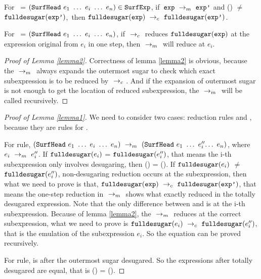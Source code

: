 \begin{lemma}[Emulation]
\label{lemma1}
For~ = $(\mbox{\tt SurfHead}~e_1~\ldots~e_i~\ldots~e_n)\in\mbox{\tt SurfExp}$, if~$\mbox{\tt exp} ~\rightarrow_m~\mbox{\tt exp'}$ and () $\not=$ $\mbox{\tt fulldesugar}(\mbox{\tt exp'})$,~then $\mbox{\tt fulldesugar}(\mbox{\tt exp}) ~\rightarrow_c~\mbox{\tt fulldesugar}(\mbox{\tt exp'})$.

\end{lemma}

\begin{lemma}
\label{lemma2}

For~ = $(\mbox{\tt SurfHead}~e_1~\ldots~e_i~\ldots~e_n)$, if $~\rightarrow_c~$ reduces $\mbox{\tt fulldesugar}(\mbox{\tt exp})$ at the expression original from $e_i$ in one step, then $~\rightarrow_m~$ will reduce  at $e_i$.

\end{lemma}

\begin{proof}[Proof of Lemma \ref{lemma2}]

Correctness of lemma \ref{lemma2} is obvious, because the $~\rightarrow_m~$ always expands the outermost sugar to check which exact subexpression is to be reduced by $~\rightarrow_c~$. And if the expansion of outermost sugar is not enough to get the location of reduced subexpression, the $~\rightarrow_m~$ will be called recursively.
\end{proof}
\begin{proof}[Proof of Lemma \ref{lemma1}]
We need to consider two cases: reduction rules  and , because they are rules for .

For  rule, $\redm{(\m{SurfHead}~e_1~\ldots~e_i~\ldots~e_n)}{(\m{SurfHead}~e_1~\ldots~e_i''$$\ldots~e_n)}$, where $e_i ~\rightarrow_m~e_i''$. 
If $\mbox{\tt fulldesugar}(e_i)$ = $\mbox{\tt fulldesugar}(e_i'')$, that means the i-th subexpression only involves desugaring, then () = (). If $\mbox{\tt fulldesugar}(e_i)$ $\not=$ $\mbox{\tt fulldesugar}(e_i'')$, non-desugaring reduction occurs at the subexpression, then what we need to prove is that, $\mbox{\tt fulldesugar}(\mbox{\tt exp}) ~\rightarrow_c~\mbox{\tt fulldesugar}(\mbox{\tt exp'})$, that means the one-step reduction in $~\rightarrow_m~$ shows what exactly reduced in the totally desugared expression. Note that the only difference between  and  is at the i-th subexpression. Because of lemma \ref{lemma2}, the $~\rightarrow_m~$ reduces  at the correct subexpression, what we need to prove is $\mbox{\tt fulldesugar}(e_i) ~\rightarrow_c~\mbox{\tt fulldesugar}(e_i'')$, that is the emulation of the subexpression $e_i$. So the equation can be proved recursively.

For  rule,  is  after the outermost sugar desugared. So the expressions after totally desugared are equal, that is () =
().
\end{proof}

